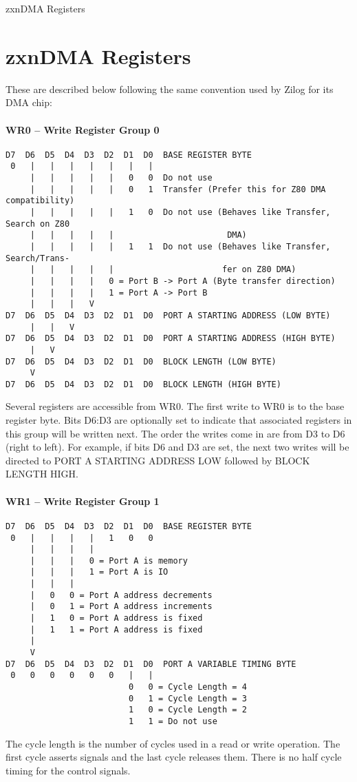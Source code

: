 \begin{table}[ht]\centering
  \caption{zxnDMA Registers}
\end{table}

\section{zxnDMA Registers}
These are described below following the same convention used by Zilog
for its DMA chip:

\paragraph{WR0 – Write Register Group 0}
\begin{verbatim}
D7  D6  D5  D4  D3  D2  D1  D0  BASE REGISTER BYTE
 0   |   |   |   |   |   |   |
     |   |   |   |   |   0   0  Do not use
     |   |   |   |   |   0   1  Transfer (Prefer this for Z80 DMA compatibility)
     |   |   |   |   |   1   0  Do not use (Behaves like Transfer, Search on Z80
     |   |   |   |   |                       DMA)
     |   |   |   |   |   1   1  Do not use (Behaves like Transfer, Search/Trans-
     |   |   |   |   |                      fer on Z80 DMA)
     |   |   |   |   0 = Port B -> Port A (Byte transfer direction)
     |   |   |   |   1 = Port A -> Port B
     |   |   |   V
D7  D6  D5  D4  D3  D2  D1  D0  PORT A STARTING ADDRESS (LOW BYTE)
     |   |   V
D7  D6  D5  D4  D3  D2  D1  D0  PORT A STARTING ADDRESS (HIGH BYTE)
     |   V
D7  D6  D5  D4  D3  D2  D1  D0  BLOCK LENGTH (LOW BYTE)
     V
D7  D6  D5  D4  D3  D2  D1  D0  BLOCK LENGTH (HIGH BYTE)
\end{verbatim}
Several registers are accessible from WR0. The first write to WR0 is
to the base register byte. Bits D6:D3 are optionally set to indicate
that associated registers in this group will be written next. The
order the writes come in are from D3 to D6 (right to left). For
example, if bits D6 and D3 are set, the next two writes will be
directed to PORT A STARTING ADDRESS LOW followed by BLOCK LENGTH HIGH.

\paragraph{WR1 – Write Register Group 1}
\begin{verbatim}
D7  D6  D5  D4  D3  D2  D1  D0  BASE REGISTER BYTE
 0   |   |   |   |   1   0   0
     |   |   |   |
     |   |   |   0 = Port A is memory
     |   |   |   1 = Port A is IO
     |   |   |
     |   0   0 = Port A address decrements
     |   0   1 = Port A address increments
     |   1   0 = Port A address is fixed
     |   1   1 = Port A address is fixed
     |
     V
D7  D6  D5  D4  D3  D2  D1  D0  PORT A VARIABLE TIMING BYTE
 0   0   0   0   0   0   |   |
                         0   0 = Cycle Length = 4
                         0   1 = Cycle Length = 3
                         1   0 = Cycle Length = 2
                         1   1 = Do not use
\end{verbatim}
The cycle length is the number of cycles used in a read or write
 operation. The first cycle asserts signals and the last cycle
 releases them. There is no half cycle timing for the control signals.

